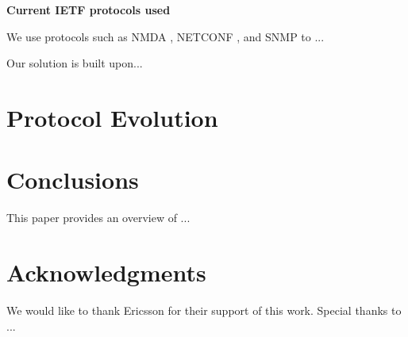 \documentclass[11pt,sigconf]{iabart}
\begin{document}

\textbf{Current IETF protocols used}

We use protocols such as NMDA \cite{rfc8342}, NETCONF \cite{rfc6241}, and SNMP \cite{rfc3411} to ...


Our solution is built upon...


\section{Protocol Evolution} \label{insights}



\section{Conclusions} \label{conclusions}

This paper provides an overview of ...

\section{Acknowledgments}

We would like to thank Ericsson for their support of this work. Special thanks to ...



\end{document}
